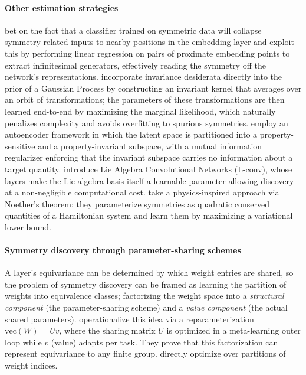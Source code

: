 \documentclass[mathematics,review,submit,moreauthors]{Definitions/mdpi}
\begin{document}
\paragraph{Other estimation strategies}
\citet{krippendorf2020} bet on the fact that a classifier trained on symmetric data will collapse symmetry-related inputs to nearby positions in the embedding layer and exploit this by performing linear regression on pairs of proximate embedding points to extract infinitesimal generators, effectively reading the symmetry off the network's representations.
\citet{vanderwilk2018anips} incorporate invariance desiderata directly into the prior of a Gaussian Process by constructing an invariant kernel that averages over an orbit of transformations; the parameters of these transformations are then learned end-to-end by maximizing the marginal likelihood, which naturally penalizes complexity and avoids overfitting to spurious symmetries.
\citet{wieser2020anips} employ an autoencoder framework in which the latent space is partitioned into a property-sensitive and a property-invariant subspace, with a mutual information regularizer enforcing that the invariant subspace carries no information about a target quantity.
\citet{dehmamy2021anips} introduce Lie Algebra Convolutional Networks (L-conv), whose layers make the Lie algebra basis itself a learnable parameter allowing discovery at a non-negligible computational cost.
\citet{ouderaa2024} take a physics-inspired approach via Noether's theorem: they parameterize symmetries as quadratic conserved quantities of a Hamiltonian system and learn them by maximizing a variational lower bound.

\paragraph{Symmetry discovery through parameter-sharing schemes}
A layer's equivariance can be determined by which weight entries are shared, so the problem of symmetry discovery can be framed as learning the partition of weights into equivalence classes; factorizing the weight space into a \textit{structural component} (the parameter-sharing scheme) and a \textit{value component} (the actual shared parameters).
\citet{zhou2021} operationalize this idea via a reparameterization $\mathrm{vec}(W) = Uv$, where the sharing matrix $U$ is optimized in a meta-learning outer loop while $v$ (value) adapts per task.
They prove that this factorization can represent equivariance to any finite group.
\citet{yeh2022p2icais} directly optimize over partitions of weight indices.
\end{document}
